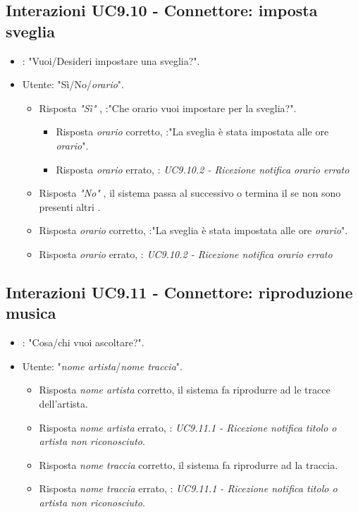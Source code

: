 \subsection{Interazioni UC9.10 - Connettore: imposta sveglia}
\begin{itemize}
        \item {}: "Vuoi/Desideri impostare una sveglia?".
        \item Utente: "Sì/No/{\it orario}".
        \begin{itemize}
         \item{Risposta {\it "Sì"} }, :"Che orario vuoi impostare per la sveglia?".
         \begin{itemize}
              \item{Risposta {\it orario} corretto}, :"La sveglia è stata impostata alle ore {\it orario}".
              \item{Risposta {\it orario} errato}, :  {\it UC9.10.2 - Ricezione notifica orario errato}
         \end{itemize}
         \item{Risposta {\it "No"} }, il sistema passa al  successivo o termina il  se non sono presenti altri .
         \item{Risposta {\it orario} corretto}, :"La sveglia è stata impostata alle ore {\it orario}".
         \item{Risposta {\it orario} errato}, :  {\it UC9.10.2 - Ricezione notifica orario errato}
         \end{itemize}
    \end{itemize}

\subsection{Interazioni UC9.11 - Connettore: riproduzione musica}
 \begin{itemize}
        \item {}: "Cosa/chi vuoi ascoltare?".
        \item Utente: "{\it nome artista}/{\it nome traccia}".
        \begin{itemize}
         \item{Risposta {\it nome artista} corretto}, il sistema fa riprodurre ad  le tracce dell'artista.
        \item{Risposta {\it nome artista} errato}, :  {\it UC9.11.1 - Ricezione notifica titolo o artista non riconosciuto}.
        \item{Risposta {\it nome traccia} corretto}, il sistema fa riprodurre ad  la traccia.
        \item{Risposta {\it nome traccia} errato}, :  {\it UC9.11.1 - Ricezione notifica titolo o artista non riconosciuto}.
         \end{itemize}
    \end{itemize}


